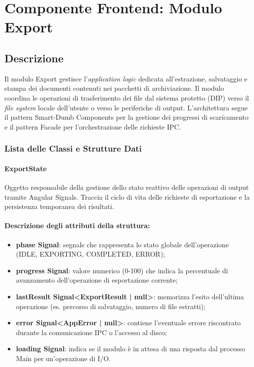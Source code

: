 \newpage
\section{Componente Frontend: Modulo Export}

\subsection{Descrizione}
Il modulo Export gestisce l'\textit{application logic} dedicata all'estrazione, salvataggio e stampa dei documenti contenuti nei pacchetti di archiviazione. Il modulo coordina le operazioni di trasferimento dei file dal sistema protetto (DIP) verso il \textit{file system} locale dell'utente o verso le periferiche di output. L'architettura segue il pattern Smart-Dumb Components per la gestione dei progressi di scaricamento e il pattern Facade per l'orchestrazione delle richieste IPC.

\subsubsection{Lista delle Classi e Strutture Dati}

\paragraph{ExportState}
Oggetto responsabile della gestione dello stato reattivo delle operazioni di output tramite Angular Signals. Traccia il ciclo di vita delle richieste di esportazione e la persistenza temporanea dei risultati.

\paragraph{Descrizione degli attributi della struttura:}
\begin{itemize}
\item \textbf{phase Signal}: segnale che rappresenta lo stato globale dell'operazione (IDLE, EXPORTING, COMPLETED, ERROR);
\item \textbf{progress Signal}: valore numerico (0-100) che indica la percentuale di avanzamento dell'operazione di esportazione corrente;
\item \textbf{lastResult Signal<ExportResult | null>}: memorizza l'esito dell'ultima operazione (es. percorso di salvataggio, numero di file estratti);
\item \textbf{error Signal<AppError | null>}: contiene l'eventuale errore riscontrato durante la comunicazione IPC o l'accesso al disco;
\item \textbf{loading Signal}: indica se il modulo è in attesa di una risposta dal processo Main per un'operazione di I/O.
\end{itemize}

